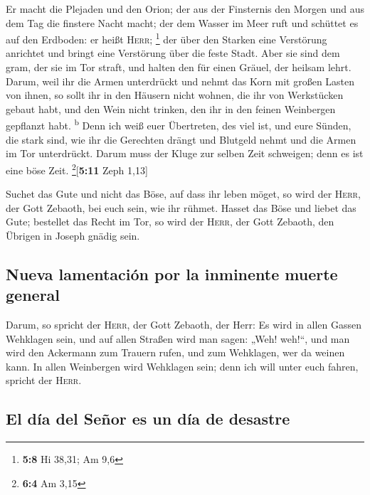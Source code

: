  Er macht die Plejaden und den Orion; der aus der
Finsternis den Morgen und aus dem Tag die finstere Nacht macht; der dem
Wasser im Meer ruft und schüttet es auf den Erdboden: er heißt
\textsc{Herr}; \footnote{\textbf{5:8} Hi 38,31; Am 9,6} 
der über den Starken eine Verstörung anrichtet und bringt eine
Verstörung über die feste Stadt.  Aber sie sind dem gram,
der sie im Tor straft, und halten den für einen Gräuel, der heilsam
lehrt.  Darum, weil ihr die Armen unterdrückt und nehmt
das Korn mit großen Lasten von ihnen, so sollt ihr in den Häusern nicht
wohnen, die ihr von Werkstücken gebaut habt, und den Wein nicht trinken,
den ihr in den feinen Weinbergen gepflanzt habt. \textsuperscript{b}
 Denn ich weiß euer Übertreten, des viel ist, und eure
Sünden, die stark sind, wie ihr die Gerechten drängt und Blutgeld nehmt
und die Armen im Tor unterdrückt.  Darum muss der Kluge
zur selben Zeit schweigen; denn es ist eine böse Zeit.
\footnote{\textbf{6:4} Am 3,15}{[}\textbf{5:11} Zeph 1,13{]}

 Suchet das Gute und nicht das Böse, auf dass ihr leben
möget, so wird der \textsc{Herr}, der Gott Zebaoth, bei euch sein, wie
ihr rühmet.  Hasset das Böse und liebet das Gute;
bestellet das Recht im Tor, so wird der \textsc{Herr}, der Gott Zebaoth,
den Übrigen in Joseph gnädig sein.

\hypertarget{nueva-lamentaciuxf3n-por-la-inminente-muerte-general}{%
\subsection{Nueva lamentación por la inminente muerte
general}\label{nueva-lamentaciuxf3n-por-la-inminente-muerte-general}}

 Darum, so spricht der \textsc{Herr}, der Gott Zebaoth,
der Herr: Es wird in allen Gassen Wehklagen sein, und auf allen Straßen
wird man sagen: „Weh! weh!{}``, und man wird den Ackermann zum Trauern
rufen, und zum Wehklagen, wer da weinen kann.  In allen
Weinbergen wird Wehklagen sein; denn ich will unter euch fahren, spricht
der \textsc{Herr}.

\hypertarget{el-duxeda-del-seuxf1or-es-un-duxeda-de-desastre}{%
\subsection{El día del Señor es un día de
desastre}\label{el-duxeda-del-seuxf1or-es-un-duxeda-de-desastre}}

